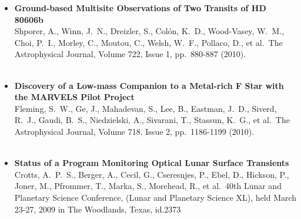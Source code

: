 \documentclass[11pt,letterpaper,sans]{moderncv} %
\begin{document}
\begin{itemize}
 \item \textbf{ Ground-based Multisite Observations of Two Transits of 
HD 80606b } \\ Shporer, A., Winn, J.~N., Dreizler, S., Col{\'o}n, K.~D., 
Wood-Vasey, W.~M., Choi, P.~I., Morley, C., Moutou, C., Welsh, W.~F., 
Pollaco, D., et al.\ The Astrophysical Journal, Volume 722, Issue 1, 
pp.~880-887 (2010).\ \\ \\ 

 \item \textbf{ Discovery of a Low-mass Companion to a Metal-rich F 
Star with the MARVELS Pilot Project } \\ Fleming, S.~W., Ge, J., Mahadevan, 
S., Lee, B., Eastman, J.~D., Siverd, R.~J., Gaudi, B.~S., Niedzielski, A., 
Sivarani, T., Stassun, K.~G., et al.\ The Astrophysical Journal, Volume 
718, Issue 2, pp.~1186-1199 (2010).\ \\ \\ 

 \item \textbf{ Status of a Program Monitoring Optical Lunar Surface 
Transients } \\ Crotts, A.~P.~S., Berger, A., Cecil, G., Cseresnjes, P., 
Ebel, D., Hickson, P., Joner, M., Pfrommer, T., Marka, S., Morehead, R., et 
al.\ 40th Lunar and Planetary Science Conference, (Lunar and Planetary 
Science XL), held March 23-27, 2009 in The Woodlands, Texas, id.2373 \\ \\ 
\end{itemize}
\end{document}
